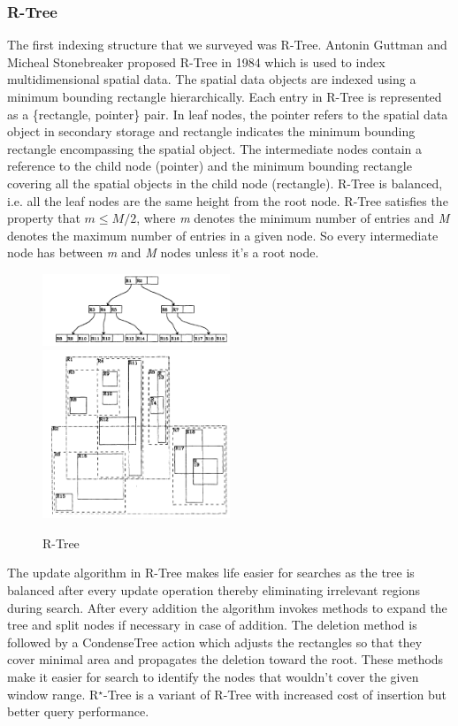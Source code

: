 \documentclass{sig-alternate-05-2015}
\begin{document}
\subsubsection{R-Tree}
The first indexing structure that we surveyed was R-Tree. Antonin Guttman and Micheal Stonebreaker\cite{guttman1984r} proposed R-Tree in 1984 which is used to index multidimensional spatial data. The spatial data objects are indexed using a minimum bounding rectangle hierarchically. Each entry in R-Tree is represented as a \{rectangle, pointer\} pair. In leaf nodes, the pointer refers to the spatial data object in secondary storage and rectangle indicates the minimum bounding rectangle encompassing the spatial object. The intermediate nodes contain a reference to the child node (pointer) and the minimum bounding rectangle covering all the spatial objects in the child node (rectangle). R-Tree is balanced, i.e. all the leaf nodes are the same height from the root node. R-Tree satisfies the property that $m \leq M/2$, where \textit{m} denotes the minimum number of entries and \textit{M} denotes the maximum number of entries in a given node. So every intermediate node has between \textit{m} and \textit{M} nodes unless it's a root node\cite{guttman1984r}.\\

\begin{figure}[h!]
\centering
\includegraphics[width=0.5\textwidth]{R-Tree1.png}
\includegraphics[width=0.5\textwidth]{R-Tree2.png}
\caption{R-Tree \cite{guttman1984r}}
\end{figure}

The update algorithm in R-Tree makes life easier for searches as the tree is balanced after every update operation thereby eliminating irrelevant regions during search. After every addition the algorithm invokes methods to expand the tree and split nodes if necessary in case of addition. The deletion method is followed by a CondenseTree action which adjusts the rectangles so that they cover minimal area and propagates the deletion toward the root. These methods make it easier for search to identify the nodes that wouldn't cover the given window range. R$^\star$-Tree is a variant of R-Tree with increased cost of insertion but better query performance\cite{guttman1984r}.\\
\end{document}
